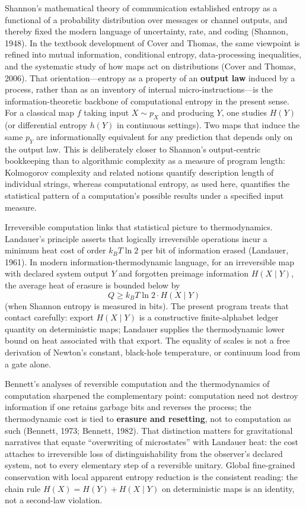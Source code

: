 \documentclass[
  11pt,
]{article}
\begin{document}
Shannon's mathematical theory of communication established entropy as a
functional of a probability distribution over messages or channel
outputs, and thereby fixed the modern language of uncertainty, rate, and
coding (Shannon, 1948). In the textbook development of Cover and Thomas,
the same viewpoint is refined into mutual information, conditional
entropy, data-processing inequalities, and the systematic study of how
maps act on distributions (Cover and Thomas, 2006). That
orientation---entropy as a property of an \textbf{output law} induced by
a process, rather than as an inventory of internal
micro-instructions---is the information-theoretic backbone of
computational entropy in the present sense. For a classical map \(f\)
taking input \(X\sim p_X\) and producing \(Y\), one studies \(H(Y)\) (or
differential entropy \(h(Y)\) in continuous settings). Two maps that
induce the same \(p_Y\) are informationally equivalent for any
prediction that depends only on the output law. This is deliberately
closer to Shannon's output-centric bookkeeping than to algorithmic
complexity as a measure of program length: Kolmogorov complexity and
related notions quantify description length of individual strings,
whereas computational entropy, as used here, quantifies the statistical
pattern of a computation's possible results under a specified input
measure.

Irreversible computation links that statistical picture to
thermodynamics. Landauer's principle asserts that logically irreversible
operations incur a minimum heat cost of order \(k_B T\ln 2\) per bit of
information erased (Landauer, 1961). In modern information-thermodynamic
language, for an irreversible map with declared system output \(Y\) and
forgotten preimage information \(H(X\mid Y)\), the average heat of
erasure is bounded below by \[
Q \ge k_B T\ln 2\cdot H(X\mid Y)
\] (when Shannon entropy is measured in bits). The present program
treats that contact carefully: export \(H(X\mid Y)\) is a constructive
finite-alphabet ledger quantity on deterministic maps; Landauer supplies
the thermodynamic lower bound on heat associated with that export. The
equality of scales is not a free derivation of Newton's constant,
black-hole temperature, or continuum load from a gate alone.

Bennett's analyses of reversible computation and the thermodynamics of
computation sharpened the complementary point: computation need not
destroy information if one retains garbage bits and reverses the
process; the thermodynamic cost is tied to \textbf{erasure and
resetting}, not to computation as such (Bennett, 1973; Bennett, 1982).
That distinction matters for gravitational narratives that equate
``overwriting of microstates'' with Landauer heat: the cost attaches to
irreversible loss of distinguishability from the observer's declared
system, not to every elementary step of a reversible unitary. Global
fine-grained conservation with local apparent entropy reduction is the
consistent reading: the chain rule \(H(X)=H(Y)+H(X\mid Y)\) on
deterministic maps is an identity, not a second-law violation.
\end{document}
